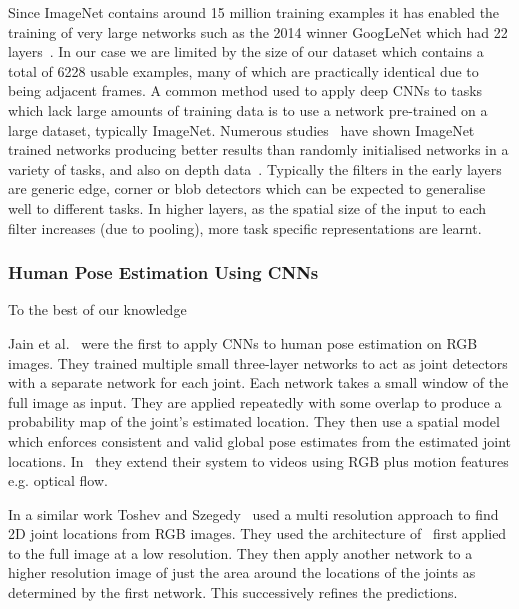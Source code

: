 \documentclass[11pt]{article} %
\begin{document}
Since ImageNet contains around 15 million training examples it has enabled the training of very large networks such as the 2014 winner GoogLeNet which had 22 layers~\cite{Szegedy2014}. In our case we are limited by the size of our dataset which contains a total of 6228 usable examples, many of which are practically identical due to being adjacent frames. A common method used to apply deep CNNs to tasks which lack large amounts of training data is to use a network pre-trained on a large dataset, typically ImageNet. Numerous studies~\cite{Sharif2014,Donahue2014,Oquab2014,Girshick2014,Yosinski2014} have shown ImageNet trained networks producing better results than randomly initialised networks in a variety of tasks, and also on depth data~\cite{Schwarz2015,Alexandre2013}. Typically the filters in the early layers are generic edge, corner or blob detectors which can be expected to generalise well to different tasks. In higher layers, as the spatial size of the input to each filter increases (due to pooling), more task specific representations are learnt. 

\subsubsection{Human Pose Estimation Using CNNs}

\label{sec:HpeCnn} 
To the best of our knowledge

Jain et al.~\cite{Jain2013a} were the first to apply CNNs to human pose estimation on RGB images. They trained multiple small three-layer networks to act as joint detectors with a separate network for each joint. Each network takes a small window of the full image as input. They are applied repeatedly with some overlap to produce a probability map of the joint's estimated location. They then use a spatial model which enforces consistent and valid global pose estimates from the estimated joint locations. In~\cite{Jain2014} they extend their system to videos using RGB plus motion features e.g. optical flow. 

In a similar work Toshev and Szegedy~\cite{Toshev} used a multi resolution approach to find 2D joint locations from RGB images. They used the architecture of~\cite{Krizhevsky2012} first applied to the full image at a low resolution. They then apply another network to a higher resolution image of just the area around the locations of the joints as determined by the first network. This successively refines the predictions. 
\end{document}
